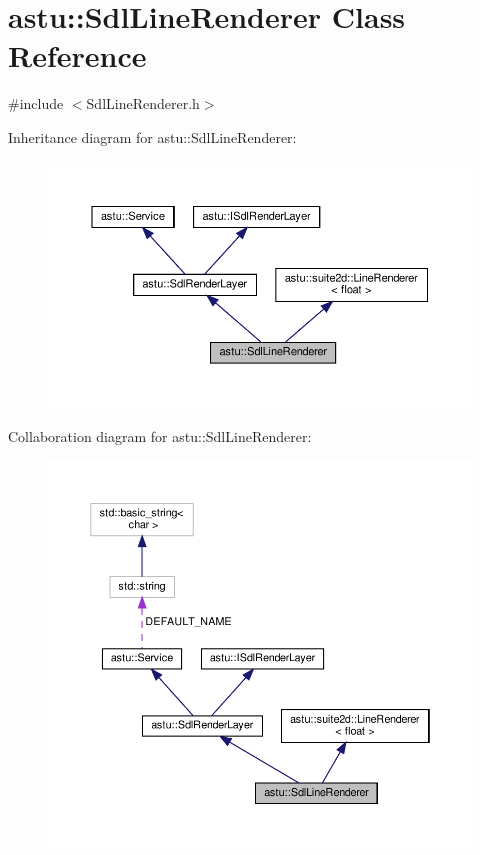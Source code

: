 \hypertarget{classastu_1_1SdlLineRenderer}{}\section{astu\+:\+:Sdl\+Line\+Renderer Class Reference}
\label{classastu_1_1SdlLineRenderer}


{\ttfamily \#include $<$Sdl\+Line\+Renderer.\+h$>$}



Inheritance diagram for astu\+:\+:Sdl\+Line\+Renderer\+:\nopagebreak
\begin{figure}[H]
\begin{center}
\leavevmode
\includegraphics[width=350pt]{classastu_1_1SdlLineRenderer__inherit__graph}
\end{center}
\end{figure}


Collaboration diagram for astu\+:\+:Sdl\+Line\+Renderer\+:\nopagebreak
\begin{figure}[H]
\begin{center}
\leavevmode
\includegraphics[width=350pt]{classastu_1_1SdlLineRenderer__coll__graph}
\end{center}
\end{figure}
